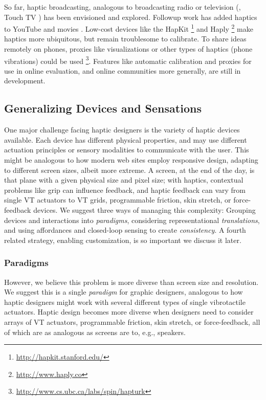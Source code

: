 So far, haptic broadcasting, analogous to broadcasting radio or television (\eg, Touch TV \cite{Modhrain2001}) has been envisioned and explored.
Followup work has added haptics to YouTube \cite{AbdurRahman2010} and movies \cite{Kim2009}.
Low-cost devices like the HapKit \cite{Martinez2016}\footnote{\url{http://hapkit.stanford.edu/}} and Haply \cite{Gallacher2016}\footnote{\url{http://www.haply.co}} make haptics more ubiquitous, but remain troublesome to calibrate.
To share ideas remotely on phones, proxies like visualizations or other types of haptics (phone vibrations) could be used \cite{Schneider2016b}\footnote{\url{http://www.cs.ubc.ca/labs/spin/hapturk}}.
Features like automatic calibration and proxies for use in online evaluation, and online communities more generally, are still in development.




\subsection{Generalizing Devices and Sensations}
One major challenge facing haptic designers is the variety of haptic devices available.
Each device has different physical properties, and may use different actuation principles or sensory modalities to communicate with the user.
This might be analogous to how modern web sites employ responsive design, adapting to different screen sizes, albeit more extreme.
A screen, at the end of the day, is that plane with a given physical size and pixel size; with haptics,
contextual problems like grip can influence feedback, and haptic feedback can vary from single VT actuators to VT grids, programmable friction, skin stretch, or force-feedback devices.
We suggest three ways of managing this complexity:
Grouping devices and interactions into \emph{paradigms},
considering representational \emph{translations}, and
using affordances and closed-loop sensing to create \emph{consistency}.
A fourth related strategy, enabling customization, is so important we discuss it later.


\subsubsection{Paradigms}
However, we believe this problem is more diverse than screen size and resolution.
We suggest this is a single \emph{paradigm} for graphic designers, analogous to how haptic designers might work with several different types of single vibrotactile actuators.
Haptic design becomes more diverse when designers need to consider arrays of VT actuators, programmable friction, skin stretch, or force-feedback, all of which are as analogous as screens are to, e.g., speakers.

